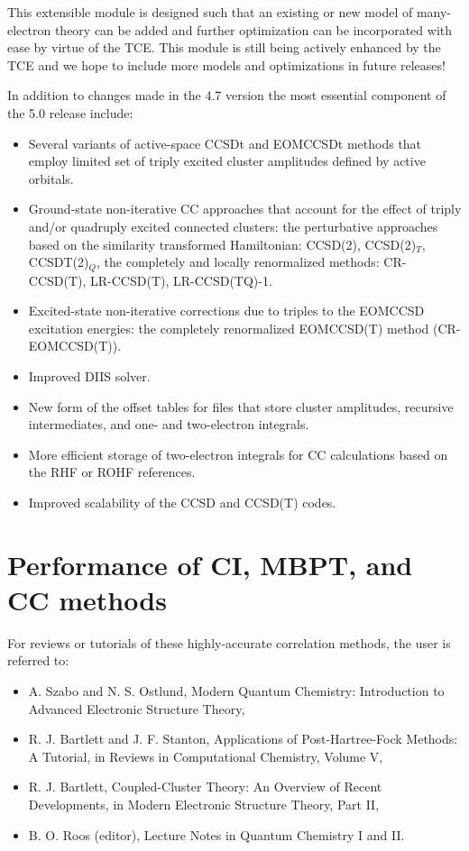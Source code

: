 This extensible module is designed such that an existing or new model of many-electron
theory can be added and further optimization can be incorporated with ease 
by virtue of the TCE.
This module is still being
actively enhanced by the TCE and we hope to include more models and optimizations
in future releases!

In addition to changes made in the 4.7 version the most essential component of the 5.0 release 
include:

\begin{itemize}

\item Several variants of active-space CCSDt and EOMCCSDt methods that employ limited set of triply 
excited cluster amplitudes defined by active orbitals.

\item  Ground-state non-iterative CC approaches that account for the effect of triply and/or
quadruply excited connected clusters: the perturbative approaches based on the similarity 
transformed Hamiltonian: CCSD(2), CCSD(2)$_T$, CCSDT(2)$_Q$, the completely and locally renormalized 
methods: CR-CCSD(T), LR-CCSD(T), LR-CCSD(TQ)-1.

\item Excited-state non-iterative corrections due to triples to the EOMCCSD excitation energies:
the completely renormalized EOMCCSD(T) method (CR-EOMCCSD(T)).

\item Improved DIIS solver.

\item New form of the offset tables for files that store cluster amplitudes, recursive intermediates,
and one- and two-electron integrals.

\item More efficient storage of two-electron integrals for CC calculations based on the RHF or ROHF 
references.

\item Improved scalability of the CCSD and CCSD(T) codes.

\end{itemize} 


\section{Performance of CI, MBPT, and CC methods}

For reviews or tutorials of these highly-accurate correlation methods, the user is 
referred to:
\begin{itemize}
\item A. Szabo and N. S. Ostlund, Modern Quantum Chemistry: Introduction to Advanced Electronic Structure Theory,
\item R. J. Bartlett and J. F. Stanton, Applications of Post-Hartree-Fock Methods: A Tutorial, in Reviews in Computational Chemistry, Volume V,
\item R. J. Bartlett, Coupled-Cluster Theory: An Overview of Recent Developments, in Modern Electronic Structure Theory, Part II,
\item B. O. Roos (editor), Lecture Notes in Quantum Chemistry I and II.
\end{itemize}

